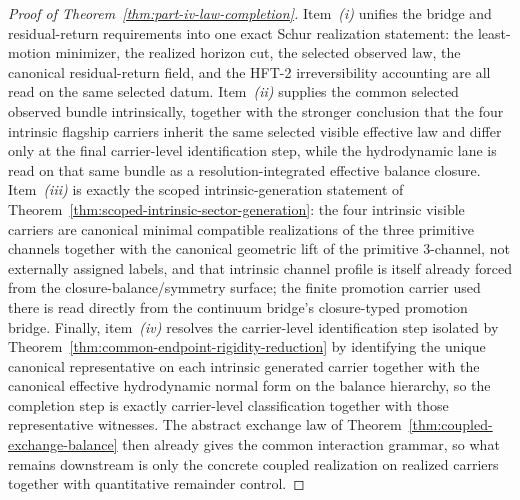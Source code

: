 \begin{proof}[Proof of Theorem~\ref{thm:part-iv-law-completion}]
\label{proof:thm:part-iv-law-completion}
Item~\emph{(i)} unifies the bridge and residual-return requirements into one
exact Schur realization statement: the least-motion minimizer, the realized
horizon cut, the selected observed law, the canonical residual-return field,
and the HFT-2 irreversibility accounting are all read on the same selected
datum. Item~\emph{(ii)} supplies the common selected observed bundle
intrinsically, together with the stronger conclusion that the four intrinsic
flagship carriers inherit the same selected visible effective law and differ
only at the final carrier-level identification step, while the hydrodynamic
lane is read on that same bundle as a resolution-integrated effective balance
closure. Item~\emph{(iii)} is exactly the scoped intrinsic-generation
statement of Theorem~\ref{thm:scoped-intrinsic-sector-generation}: the four
intrinsic visible carriers are canonical minimal compatible realizations of
the three primitive channels together with the canonical geometric lift of the
primitive \(3\)-channel, not externally assigned labels, and that intrinsic
channel profile is itself already forced from the closure-balance/symmetry
surface; the finite promotion carrier used there is read directly from the
continuum bridge's closure-typed promotion bridge. Finally,
item~\emph{(iv)} resolves the carrier-level identification step isolated by
Theorem~\ref{thm:common-endpoint-rigidity-reduction} by identifying the unique
canonical representative on each intrinsic generated carrier together with the
canonical effective hydrodynamic normal form on the balance hierarchy, so the
completion step is exactly carrier-level classification together with those
representative witnesses. The abstract exchange law
of Theorem~\ref{thm:coupled-exchange-balance} then already gives the common
interaction grammar, so what remains downstream is only the concrete coupled
realization on realized carriers together with quantitative remainder control.
\end{proof}


